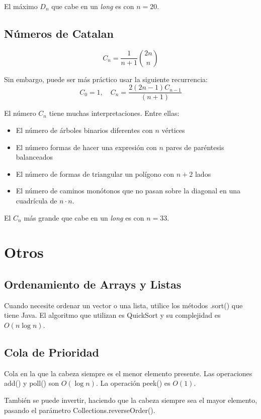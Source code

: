 \documentclass{article}
\begin{document}
\begin{multicols}{2}
	El máximo \( D_n \) que cabe en un \emph{long} es con \( n=20 \).

	\subsection{Números de Catalan}
	\[
		C_{n} = \frac{1}{n+1} \binom{2n}{n}
	\]

	Sin embargo, puede ser más práctico usar la siguiente recurrencia:
	\[
		C_0 = 1, \quad C_{n} = \frac{2(2n-1)C_{n-1}}{(n+1)}
	\]

	El número \( C_{n} \) tiene muchas interpretaciones. Entre ellas:

	\begin{itemize}
		\item El número de árboles binarios diferentes con \( n \) vértices
		\item El número formas de hacer una expresión con \( n \) pares de paréntesis balanceados
		\item El número de formas de triangular un polígono con \( n+2 \) lados
		\item El número de caminos monótonos que no pasan sobre la diagonal en una cuadrícula de \( n \cdot n \).
	\end{itemize}

	El \( C_{n} \) más grande que cabe en un \emph{long} es con \( n = 33 \). 
		
\section{Otros}
	\subsection{Ordenamiento de Arrays y Listas}
	Cuando necesite ordenar un vector o una lista, utilice los métodos .sort() que tiene 		Java. El algoritmo que utilizan es QuickSort y su complejidad es \( O(n\log n) \).
	
	
	\subsection{Cola de Prioridad}
	Cola en la que la cabeza siempre es el menor elemento presente. Las operaciones add() y poll() son \( O(\log n ) \). La operación peek() es \( O(1) \).
	
	También se puede invertir, haciendo que la cabeza siempre sea el mayor elemento, pasando el parámetro Collections.reverseOrder().
	
	

\end{multicols}
\end{document}
